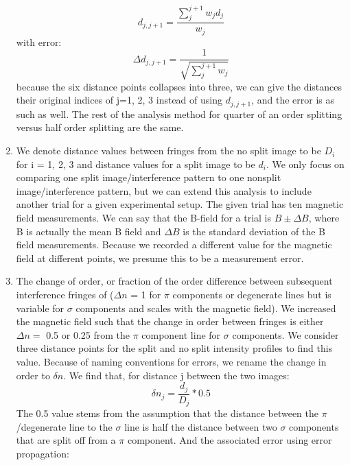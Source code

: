 \documentclass{article}
\begin{document}
\begin{enumerate}
        \begin{equation}
            d_{j,j+1} = \frac{\sum_j^{j+1} w_j d_j}{w_j}
        \end{equation}
        with error:
        \begin{equation}
            \Delta d_{j,j+1} = \frac{1}{\sqrt{\sum_j^{j+1} w_j}}
        \end{equation}
        because the six distance points collapses into three, we can give the distances their original indices of j=1, 2, 3 instead of using $d_{j,j+1}$, and the error is as such as well. The rest of the analysis method for quarter of an order splitting versus half order splitting are the same.
        \item We denote distance values between fringes from the no split image to be $D_i$ for i = 1, 2, 3 and distance values for a split image to be $d_i$. We only focus on comparing one split image/interference pattern to one nonsplit image/interference pattern, but we can extend this analysis to include another trial for a given experimental setup. The given trial has ten magnetic field measurements. We can say that the B-field for a trial is $B \pm \Delta B$, where B is actually the mean B field and $\Delta B$ is the standard deviation of the B field measurements. Because we recorded a different value for the magnetic field at different points, we presume this to be a measurement error. 
        \item The change of order, or fraction of the order difference between subsequent interference fringes of ($\Delta n$ = 1 for $\pi$ components or degenerate lines but is variable for $\sigma$ components and scales with the magnetic field). We increased the magnetic field such that the change in order between fringes is either $\Delta n =$ 0.5 or 0.25 from the $\pi$ component line for $\sigma$ components. We consider three distance points for the split and no split intensity profiles to find this value. Because of naming conventions for errors, we rename the change in order to $\delta n$. We find that, for distance j between the two images:
        \begin{equation}
            \delta n_j = \frac{d_j}{D_j}*0.5
        \end{equation}
        The 0.5 value stems from the assumption that the distance between the $\pi$/degenerate line to the $\sigma$ line is half the distance between two $\sigma$ components that are split off from a $\pi$ component. And the associated error using error propagation:
        \begin{equation}

\end{equation}
\end{enumerate}
\end{document}
